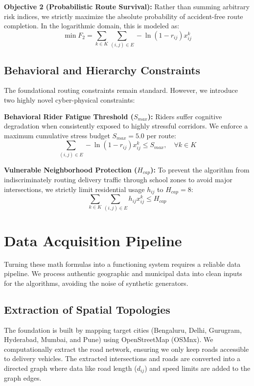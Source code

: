 \documentclass[10pt,twocolumn,letterpaper]{article}
\begin{document}
\textbf{Objective 2 (Probabilistic Route Survival):} Rather than summing arbitrary risk indices, we strictly maximize the absolute probability of accident-free route completion. In the logarithmic domain, this is modeled as:
\begin{equation}
\min F_2 = \sum_{k \in K} \sum_{(i,j) \in E} -\ln(1 - r_{ij}) x_{ij}^k
\end{equation}

\subsection{Behavioral and Hierarchy Constraints}

The foundational routing constraints remain standard. However, we introduce two highly novel cyber-physical constraints:

\noindent\textbf{Behavioral Rider Fatigue Threshold ($S_{max}$):}
Riders suffer cognitive degradation when consistently exposed to highly stressful corridors. We enforce a maximum cumulative stress budget $S_{max}=5.0$ per route:
\begin{equation}
\sum_{(i,j) \in E} -\ln(1 - r_{ij}) x_{ij}^k \leq S_{max}, \quad \forall k \in K
\end{equation}

\noindent\textbf{Vulnerable Neighborhood Protection ($H_{cap}$):}
To prevent the algorithm from indiscriminately routing delivery traffic through school zones to avoid major intersections, we strictly limit residential usage $h_{ij}$ to $H_{cap}=8$:
\begin{equation}
\sum_{k \in K} \sum_{(i,j) \in E} h_{ij} x_{ij}^k \leq H_{cap}
\end{equation}

\section{Data Acquisition Pipeline}

Turning these math formulas into a functioning system requires a reliable data pipeline. We process authentic geographic and municipal data into clean inputs for the algorithms, avoiding the noise of synthetic generators.

\subsection{Extraction of Spatial Topologies}

The foundation is built by mapping target cities (Bengaluru, Delhi, Gurugram, Hyderabad, Mumbai, and Pune) using OpenStreetMap (OSMnx). We computationally extract the road network, ensuring we only keep roads accessible to delivery vehicles. The extracted intersections and roads are converted into a directed graph where data like road length ($d_{ij}$) and speed limits are added to the graph edges.
\end{document}
